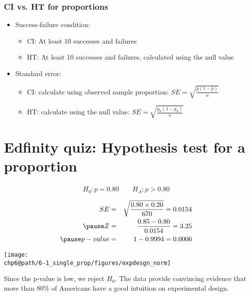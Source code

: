 \documentclass[slidestop,compress,mathserif]{beamer}
\makeatletter
\def\chp6@path{../../Chp 6}
\makeatother
\begin{document}

\begin{frame}
\frametitle{CI vs. HT for proportions}

\begin{itemize}

\item Success-failure condition:
\begin{itemize}
\item CI: At least 10  successes and failures
\item HT: At least 10  successes and failures, calculated using the null value
\end{itemize}

\item Standard error:
\begin{itemize}
\item CI: calculate using observed sample proportion: $SE = \sqrt{\frac{\hat{p}(1-\hat{p})}{n}}$
\item HT: calculate using the null value: $SE = \sqrt{\frac{p_0(1-p_0)}{n}}$
\end{itemize}

\end{itemize}

\end{frame}


\section{Edfinity quiz: Hypothesis test for a proportion} 


\begin{frame}
\frametitle{}


\pause 

\[ H_0: p = 0.80 \qquad H_A: p > 0.80 \]

{
\pause
\begin{eqnarray*}
SE &=& \sqrt{\frac{0.80 \times 0.20}{670}} = 0.0154 \\
\pause
Z &=& \frac{0.85 - 0.80}{0.0154} = 3.25 \\
\pause
p-value &=& 1 - 0.9994 = 0.0006 \\
\end{eqnarray*}
}
{
\begin{center}
\texttt{[image: \\chp6@path/6-1\_single\_prop/figures/expdesgn\_norm]}
\end{center}
}
\pause
Since the p-value is low, we reject $H_0$. The data provide convincing evidence that more than 80\% of Americans have a good intuition on experimental design.

\end{frame}
\end{document}
